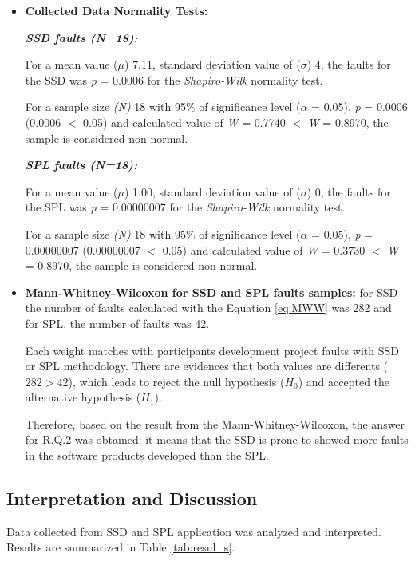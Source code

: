 \begin{itemize}

\item \textbf{Collected Data Normality Tests:} 

\textbf{\textit{SSD faults (\textit{N}=18):}}

For a mean value ($\mu$) 7.11, standard deviation value of ($\sigma$) 4, the faults for the SSD was \textit{p} = 0.0006 for the \textit{Shapiro-Wilk} normality test.

For a sample size \textit{(N)} 18 with 95\% of significance level ($\alpha$ = 0.05), \textit{p} = 0.0006 (0.0006 $<$ 0.05) and calculated value of \textit{W} = 0.7740 $<$ \textit{W} = 0.8970, the sample is considered non-normal.

\textbf{\textit{SPL faults (\textit{N}=18):}}

For a mean value ($\mu$) 1.00, standard deviation value of ($\sigma$) 0, the faults for the SPL was \textit{p} = 0.00000007 for the \textit{Shapiro-Wilk} normality test.

For a sample size \textit{(N)} 18 with 95\% of significance level ($\alpha$ = 0.05), \textit{p} = 0.00000007 (0.00000007 $<$ 0.05) and calculated value of \textit{W} = 0.3730 $<$ \textit{W} = 0.8970, the sample is considered non-normal.

\item \textbf{Mann-Whitney-Wilcoxon for SSD and SPL faults samples:} for SSD the number of faults calculated with the Equation \ref{eq:MWW} was 282 and for SPL, the number of faults was 42.

Each weight matches with participants development project faults with SSD or SPL methodology. There are evidences that both values are differents ($282>42$), which leads to reject the null hypothesis ($H_0$) and accepted the alternative hypothesis ($H_{1}$).

Therefore, based on the result from the Mann-Whitney-Wilcoxon, the answer for R.Q.2 was obtained: it means that the SSD is prone to showed more faults in the software products developed than the SPL.

\end{itemize}

\subsection{Interpretation and Discussion}\label{sub:interpretation}

Data collected from SSD and SPL application was analyzed and interpreted. Results are summarized in Table \ref{tab:resul_s}.

